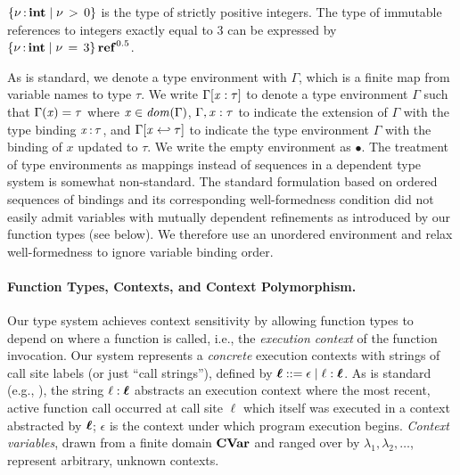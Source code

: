 \begin{example}
  $ \left\{{  \nu  \operatorname{:} \mathbf{int} \mid  \nu \, > \, 0 }\right\} $ is the type of strictly positive integers.
  The type of immutable
  references to integers exactly equal to $3$ can be expressed by
  $  \left\{{  \nu  \operatorname{:} \mathbf{int} \mid  \nu \, = \, 3 }\right\}   \operatorname{\mathbf{ref}}^{ 0  .  5 } $.
\end{example}

As is standard, we denote a type environment with $\Gamma$, which is a
finite map from variable names to type $\tau$.
We write $\Gamma  [  \mathit{x}  :  \tau  ]$ to denote a type environment $\Gamma$ such
that $\Gamma  (  \mathit{x}  )  =  \tau$ where $ \mathit{x}  \in   \mathit{dom}( \Gamma )  $, $\Gamma  ,  \mathit{x}  :  \tau$ to indicate the
extension of $\Gamma$ with the type binding $ \mathit{x} \operatorname{:} \tau $, and $\Gamma  [  \mathit{x}  \hookleftarrow  \tau  ]$
to indicate the type environment $\Gamma$ with the binding of $\mathit{x}$
updated to $\tau$. We write the empty environment as $ \bullet $.
The treatment of type environments as mappings instead of sequences
in a dependent type system is somewhat non-standard.
The standard formulation based on ordered sequences of bindings and
its corresponding well-formedness condition did not easily admit
variables with mutually dependent refinements as introduced by
our function types (see below). We therefore use an unordered
environment and relax well-formedness to ignore variable binding order.

\paragraph{Function Types, Contexts, and Context Polymorphism.}
Our type system achieves context sensitivity
by allowing function types to depend on where a function
is called, i.e., the \emph{execution context} of the function invocation.
Our system represents a \emph{concrete} execution contexts with
strings of call site labels (or just ``call strings''),
defined by $\oldvec{\ell} ::=  \epsilon  \mid \ell  \ottsym{:}  \oldvec{\ell}$.
As is standard (e.g., \cite{sharir1978two,shivers1991control}), the string $\ell  \ottsym{:}  \oldvec{\ell}$ abstracts
an execution context where the most recent, active function call occurred
at call site $\ell$ which itself was executed in a context abstracted
by $\oldvec{\ell}$; $ \epsilon $ is the context under which program execution begins. \emph{Context variables},
drawn from a finite domain $\textbf{CVar}$ and ranged over by $\lambda_{{\mathrm{1}}}, \lambda_{{\mathrm{2}}}, \ldots$,
represent arbitrary, unknown contexts.

